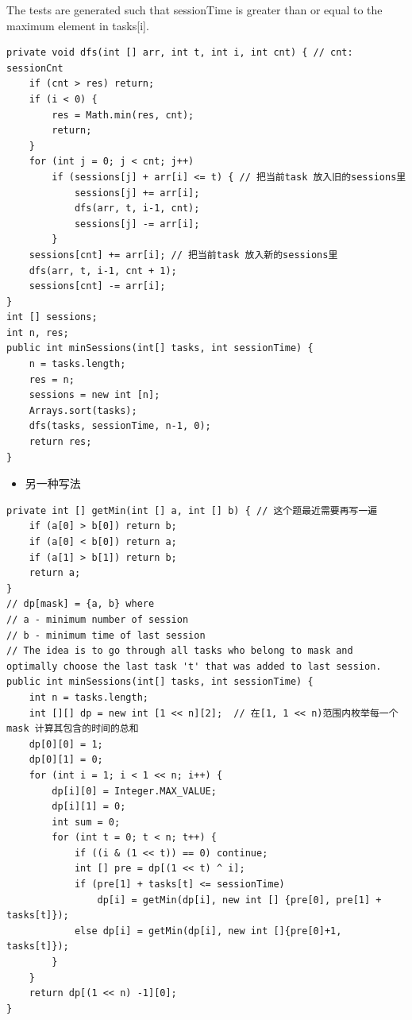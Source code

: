\documentclass[9pt, b5paper]{article}
\begin{document}
The tests are generated such that sessionTime is greater than or equal to the maximum element in tasks[i].
\begin{verbatim}
private void dfs(int [] arr, int t, int i, int cnt) { // cnt: sessionCnt
    if (cnt > res) return;
    if (i < 0) {
        res = Math.min(res, cnt);
        return;
    }
    for (int j = 0; j < cnt; j++) 
        if (sessions[j] + arr[i] <= t) { // 把当前task 放入旧的sessions里
            sessions[j] += arr[i];
            dfs(arr, t, i-1, cnt);
            sessions[j] -= arr[i];
        }
    sessions[cnt] += arr[i]; // 把当前task 放入新的sessions里
    dfs(arr, t, i-1, cnt + 1);
    sessions[cnt] -= arr[i];
}
int [] sessions;
int n, res;
public int minSessions(int[] tasks, int sessionTime) {
    n = tasks.length;
    res = n;
    sessions = new int [n];
    Arrays.sort(tasks);
    dfs(tasks, sessionTime, n-1, 0);
    return res;
}
\end{verbatim}
\begin{itemize}
\item 另一种写法
\end{itemize}
\begin{verbatim}
private int [] getMin(int [] a, int [] b) { // 这个题最近需要再写一遍
    if (a[0] > b[0]) return b;
    if (a[0] < b[0]) return a;
    if (a[1] > b[1]) return b;
    return a;
}
// dp[mask] = {a, b} where
// a - minimum number of session
// b - minimum time of last session
// The idea is to go through all tasks who belong to mask and optimally choose the last task 't' that was added to last session.
public int minSessions(int[] tasks, int sessionTime) {
    int n = tasks.length;
    int [][] dp = new int [1 << n][2];  // 在[1, 1 << n)范围内枚举每一个mask 计算其包含的时间的总和
    dp[0][0] = 1;
    dp[0][1] = 0;
    for (int i = 1; i < 1 << n; i++) {
        dp[i][0] = Integer.MAX_VALUE;
        dp[i][1] = 0;
        int sum = 0;
        for (int t = 0; t < n; t++) {
            if ((i & (1 << t)) == 0) continue;
            int [] pre = dp[(1 << t) ^ i];
            if (pre[1] + tasks[t] <= sessionTime)
                dp[i] = getMin(dp[i], new int [] {pre[0], pre[1] + tasks[t]});
            else dp[i] = getMin(dp[i], new int []{pre[0]+1, tasks[t]});
        }
    }
    return dp[(1 << n) -1][0];
}
\end{verbatim}
\end{document}
